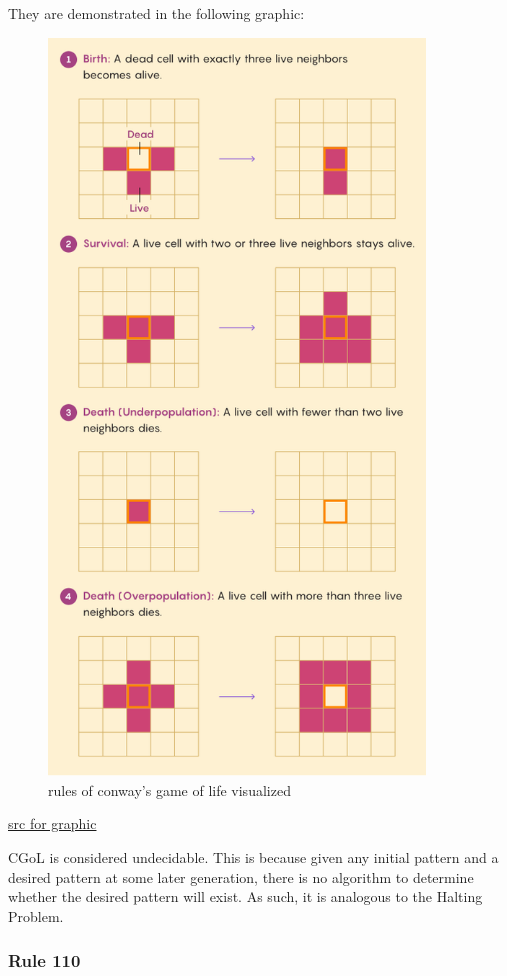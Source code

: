They are demonstrated in the following graphic:

\begin{figure}[h!]
    \centering
    \includegraphics[width=10cm]{images/cgol.png}
       \caption{rules of conway's game of life visualized}
           \label{fig:cgolrules}
\end{figure}

\href{https://www.quantamagazine.org/maths-game-of-life-reveals-long-sought-repeating-patterns-20240118/}{src for graphic}

CGoL is considered undecidable.
This is because given any initial pattern and a desired pattern at some later generation, there is no algorithm to determine whether the desired pattern will exist.
As such, it is analogous to the Halting Problem.

\subsubsection{Rule 110}\label{subsubsec:Rule110}

